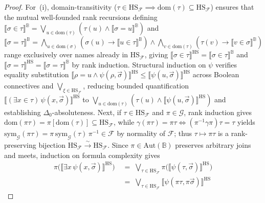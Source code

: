 \begin{proof}
For~(i), domain-transitivity ($\tau \in \mathrm{HS}_{\mathcal{F}} \implies \mathrm{dom}(\tau) \subseteq \mathrm{HS}_{\mathcal{F}}$) ensures that the mutual well-founded rank recursions defining $\llbracket \sigma \in \tau \rrbracket^{\mathbb{B}} = \bigvee_{u \in \mathrm{dom}(\tau)} (\tau(u) \wedge \llbracket \sigma = u \rrbracket^{\mathbb{B}})$ and $\llbracket \sigma = \tau \rrbracket^{\mathbb{B}} = \bigwedge_{u \in \mathrm{dom}(\sigma)} (\sigma(u) \to \llbracket u \in \tau \rrbracket^{\mathbb{B}}) \wedge \bigwedge_{v \in \mathrm{dom}(\tau)} (\tau(v) \to \llbracket v \in \sigma \rrbracket^{\mathbb{B}})$ range exclusively over names already in $\mathrm{HS}_{\mathcal{F}}$, giving $\llbracket \sigma \in \tau \rrbracket^{\mathrm{HS}} = \llbracket \sigma \in \tau \rrbracket^{\mathbb{B}}$ and $\llbracket \sigma = \tau \rrbracket^{\mathrm{HS}} = \llbracket \sigma = \tau \rrbracket^{\mathbb{B}}$ by rank induction. Structural induction on $\psi$ verifies equality substitution $\llbracket \rho = u \wedge \psi(\rho, \vec{\sigma}) \rrbracket^{\mathrm{HS}} \le \llbracket \psi(u, \vec{\sigma}) \rrbracket^{\mathrm{HS}}$ across Boolean connectives and $\bigvee_{\xi \in \mathrm{HS}_{\mathcal{F}}}$, reducing bounded quantification $\llbracket (\exists x \in \tau)\,\psi(x, \vec{\sigma}) \rrbracket^{\mathrm{HS}}$ to $\bigvee_{u \in \mathrm{dom}(\tau)} (\tau(u) \wedge \llbracket \psi(u, \vec{\sigma}) \rrbracket^{\mathrm{HS}})$ and establishing $\Delta_0$-absoluteness. Next, if $\tau \in \mathrm{HS}_{\mathcal{F}}$ and $\pi \in \mathcal{G}$, rank induction gives $\mathrm{dom}(\pi\tau) = \pi[\mathrm{dom}(\tau)] \subseteq \mathrm{HS}_{\mathcal{F}}$, while $\gamma(\pi\tau) = \pi\tau \iff (\pi^{-1}\gamma\pi)\tau = \tau$ yields $\mathrm{sym}_{\mathcal{G}}(\pi\tau) = \pi\,\mathrm{sym}_{\mathcal{G}}(\tau)\,\pi^{-1} \in \mathcal{F}$ by normality of $\mathcal{F}$; thus $\tau \mapsto \pi\tau$ is a rank-preserving bijection $\mathrm{HS}_{\mathcal{F}} \xrightarrow{\sim} \mathrm{HS}_{\mathcal{F}}$. Since $\pi \in \mathrm{Aut}(\mathbb{B})$ preserves arbitrary joins and meets, induction on formula complexity gives
\[
  \begin{aligned}
    \pi\bigl(\llbracket \exists x\,\psi(x, \vec{\sigma}) \rrbracket^{\mathrm{HS}}\bigr)
    &\;=\; \bigvee_{\tau \in \mathrm{HS}_{\mathcal{F}}} \pi\bigl(\llbracket \psi(\tau, \vec{\sigma}) \rrbracket^{\mathrm{HS}}\bigr) \\
    &\;=\; \bigvee_{\tau \in \mathrm{HS}_{\mathcal{F}}} \llbracket \psi(\pi\tau, \pi\vec{\sigma}) \rrbracket^{\mathrm{HS}}

\end{aligned}\]
\end{proof}

